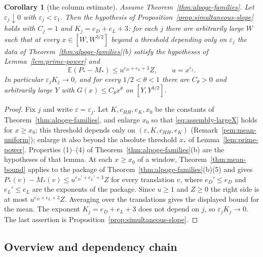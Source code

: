 \documentclass[10pt]{amsart}
\newtheorem{corollary}[theorem]{Corollary}
\theoremstyle{definition}
\theoremstyle{remark}
\begin{document}
\begin{corollary}[the column estimate]\label{cor:obligation}
Assume Theorem~\ref{thm:alpoge-families}. Let $\varepsilon_j\downarrow0$
with $\varepsilon_j<\varepsilon_1$. Then the hypothesis of
Proposition~\ref{prop:simultaneous-slope} holds with $C_j=1$ and
$K_j=e_D+e_L+3$: for each $j$ there are arbitrarily large $W$ such that at
every $x\in[W,W^{3/2}]$ beyond a threshold depending only on
$\varepsilon_j$ the data of Theorem~\ref{thm:alpoge-families}(b)
satisfy the hypotheses of Lemma~\ref{lem:prime-power} and
\[
 \mathbb E(P_*-M_*)\le u^{e_D+e_L+3}Z,\qquad u=x^{\varepsilon_j}.
\]
In particular $\varepsilon_jK_j\to0$, and for every $1/2<\theta<1$ there
are $C_\theta>0$ and arbitrarily large $Y$ with $G(x)\le C_\theta x^\theta$
on $[Y,Y^{3/2}]$.
\end{corollary}
\begin{proof}
Fix $j$ and write $\varepsilon=\varepsilon_j$. Let $K,c_{HH},e_K,x_0$ be the
constants of Theorem~\ref{thm:alpoge-families}, and enlarge $x_0$ so that
\eqref{eq:assembly-largeX} holds for $x\ge x_0$; this threshold depends
only on $(\varepsilon,K,c_{HH},e_K)$ (Remark~\ref{rem:mean-uniform}); enlarge it
also beyond the absolute threshold $x_*$ of Lemma~\ref{lem:prime-power}.
Properties (1)--(4) of
Theorem~\ref{thm:alpoge-families}(b) are the hypotheses of that lemma. At
each $x\ge x_0$ of a window, Theorem~\ref{thm:mean-bound} applies to the
package of Theorem~\ref{thm:alpoge-families}(b)(5) and gives
$P_*(v)-M_*(v)\le u^{e_D'+e_L'+3}Z$ for every translation $v$, where
$e_D'\le e_D$ and $e_L'\le e_L$ are the exponents of the package. Since
$u\ge1$ and $Z\ge0$ the right side is at most $u^{e_D+e_L+3}Z$. Averaging
over the translations gives the displayed bound for the mean. The exponent
$K_j=e_D+e_L+3$ does not depend on $j$, so $\varepsilon_jK_j\to0$. The
last assertion is Proposition~\ref{prop:simultaneous-slope}.
\end{proof}

\subsection{Overview and dependency chain}\label{inp:ssec-overview}
\end{document}
